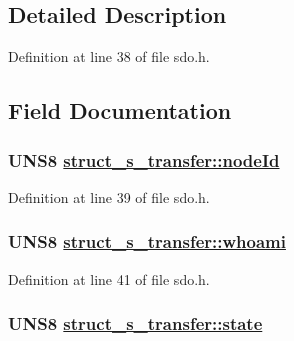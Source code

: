 \subsection{Detailed Description}




Definition at line 38 of file sdo.h.

\subsection{Field Documentation}
\hypertarget{structstruct__s__transfer_2b0484e16a202ee1bfd43e16b0bae16f}{
\subsubsection[nodeId]{\setlength{\rightskip}{0pt plus 5cm}UNS8 \hyperlink{structstruct__s__transfer_2b0484e16a202ee1bfd43e16b0bae16f}{struct\_\-s\_\-transfer::node\-Id}}}
\label{structstruct__s__transfer_2b0484e16a202ee1bfd43e16b0bae16f}




Definition at line 39 of file sdo.h.\hypertarget{structstruct__s__transfer_aa0efe13c25c38cc79842b3eded01b96}{
\subsubsection[whoami]{\setlength{\rightskip}{0pt plus 5cm}UNS8 \hyperlink{structstruct__s__transfer_aa0efe13c25c38cc79842b3eded01b96}{struct\_\-s\_\-transfer::whoami}}}
\label{structstruct__s__transfer_aa0efe13c25c38cc79842b3eded01b96}




Definition at line 41 of file sdo.h.\hypertarget{structstruct__s__transfer_41d265854e5ebb062db224276888ab21}{
\subsubsection[state]{\setlength{\rightskip}{0pt plus 5cm}UNS8 \hyperlink{structstruct__s__transfer_41d265854e5ebb062db224276888ab21}{struct\_\-s\_\-transfer::state}}}
\label{structstruct__s__transfer_41d265854e5ebb062db224276888ab21}




